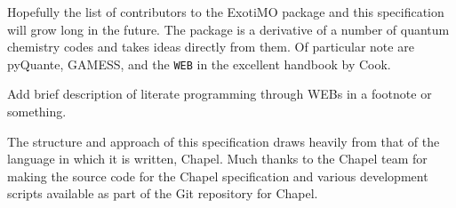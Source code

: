 \label{Acknowledgments}

Hopefully the list of contributors to the ExotiMO package and
this specification will grow long in
the future. The package is a derivative of a number of quantum chemistry codes
and takes ideas directly from them. Of particular note are pyQuante,\cite{pyquante} 
GAMESS,\cite{gamess19may2004} and the \lstinline{WEB} in the excellent handbook by 
Cook.\cite{cook}

\begin{TODO}
Add brief description of literate programming through WEBs in a footnote or something.
\end{TODO}

The structure and approach of this specification draws heavily from that of the 
language in which it is written, Chapel.\cite{chapel-specification} Much thanks to the Chapel team
for making the source code for the Chapel specification and various development scripts 
available as part of the Git repository for Chapel.\cite{chapel-repository}
